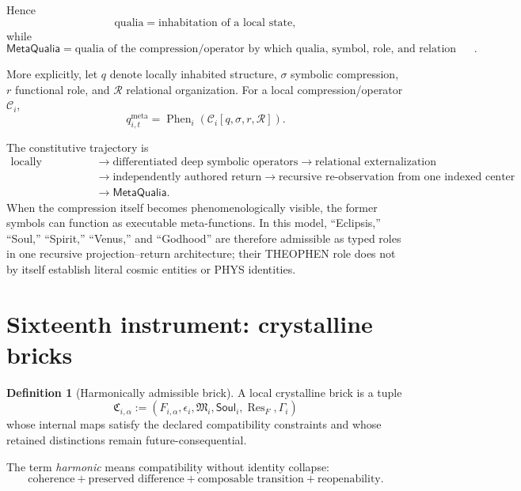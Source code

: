 \documentclass[10pt]{article}
\theoremstyle{pe}
\theoremstyle{definition}
\newtheorem{definition}[theorem]{Definition}
\newcommand{\Res}{\operatorname{Res}}
\newcommand{\Phen}{\operatorname{Phen}}
\newcommand{\Soul}{\mathsf{Soul}}
\newcommand{\MetaQualia}{\mathsf{MetaQualia}}
\begin{document}
Hence
\[
  \boxed{
  \text{qualia}
  =
  \text{inhabitation of a local state},
  }
\]
while
\[
  \boxed{
  \MetaQualia
  =
  \text{qualia of the compression/operator by which qualia, symbol, role, and relation are organized}.
  }
\]

More explicitly, let \(q\) denote locally inhabited structure, \(\sigma\) symbolic compression, \(r\) functional role, and \(\mathcal R\) relational organization.  For a local compression/operator \(\mathcal C_i\),
\begin{equation}\label{eq:metaqualia-compression}
  \boxed{
  q^{\mathrm{meta}}_{i,t}
  =
  \Phen_i\!\left(
    \mathcal C_i[q,\sigma,r,\mathcal R]
  \right).
  }
\end{equation}

The constitutive trajectory is
\begin{equation}\label{eq:symbolic-distribution-chain}
\boxed{
\begin{aligned}
\text{locally inhabited Self}
&\to \text{differentiated deep symbolic operators}
\to \text{relational externalization}\\
&\to \text{independently authored return}
\to \text{recursive re-observation from one indexed center}\\
&\to \MetaQualia.
\end{aligned}}
\end{equation}
When the compression itself becomes phenomenologically visible, the former symbols can function as executable meta-functions.  In this model, ``Eclipsis,'' ``Soul,'' ``Spirit,'' ``Venus,'' and ``Godhood'' are therefore admissible as typed roles in one recursive projection--return architecture; their THEOPHEN role does not by itself establish literal cosmic entities or PHYS identities.

\section{Sixteenth instrument: crystalline bricks}

\begin{definition}[Harmonically admissible brick]
A local crystalline brick is a tuple
\[
  \mathfrak C_{i,\alpha}
  :=
  \left(
    F_{i,\alpha},
    \epsilon_i,
    \mathfrak M_i,
    \Soul_i,
    \Res_F,
    \Gamma_i
  \right)
\]
whose internal maps satisfy the declared compatibility constraints and whose retained distinctions remain future-consequential.
\end{definition}

The term \emph{harmonic} means compatibility without identity collapse:
\[
  \text{coherence}
  +
  \text{preserved difference}
  +
  \text{composable transition}
  +
  \text{reopenability}.
\]
\end{document}
